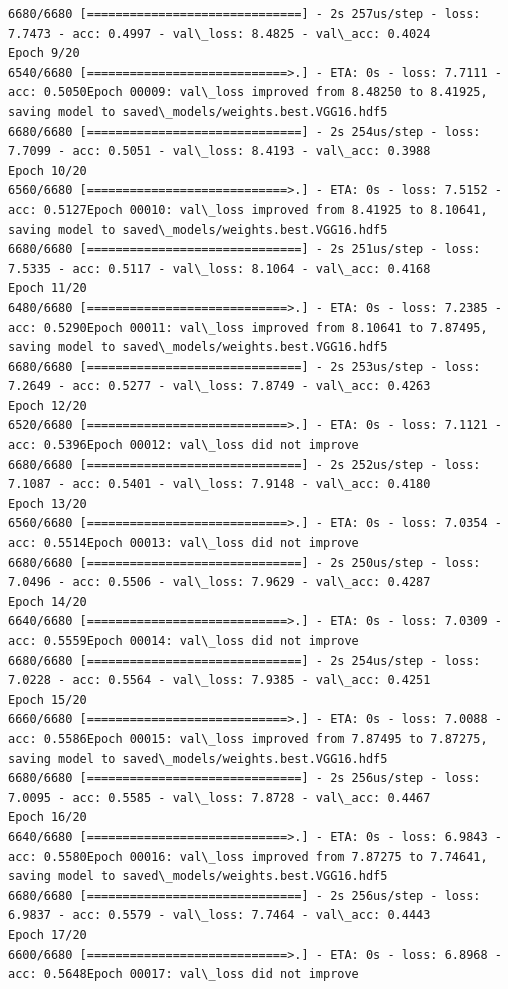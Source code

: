 \documentclass[11pt]{article}
\begin{document}
\begin{Verbatim}[commandchars=\\\{\}]
6680/6680 [==============================] - 2s 257us/step - loss: 7.7473 - acc: 0.4997 - val\_loss: 8.4825 - val\_acc: 0.4024
Epoch 9/20
6540/6680 [============================>.] - ETA: 0s - loss: 7.7111 - acc: 0.5050Epoch 00009: val\_loss improved from 8.48250 to 8.41925, saving model to saved\_models/weights.best.VGG16.hdf5
6680/6680 [==============================] - 2s 254us/step - loss: 7.7099 - acc: 0.5051 - val\_loss: 8.4193 - val\_acc: 0.3988
Epoch 10/20
6560/6680 [============================>.] - ETA: 0s - loss: 7.5152 - acc: 0.5127Epoch 00010: val\_loss improved from 8.41925 to 8.10641, saving model to saved\_models/weights.best.VGG16.hdf5
6680/6680 [==============================] - 2s 251us/step - loss: 7.5335 - acc: 0.5117 - val\_loss: 8.1064 - val\_acc: 0.4168
Epoch 11/20
6480/6680 [============================>.] - ETA: 0s - loss: 7.2385 - acc: 0.5290Epoch 00011: val\_loss improved from 8.10641 to 7.87495, saving model to saved\_models/weights.best.VGG16.hdf5
6680/6680 [==============================] - 2s 253us/step - loss: 7.2649 - acc: 0.5277 - val\_loss: 7.8749 - val\_acc: 0.4263
Epoch 12/20
6520/6680 [============================>.] - ETA: 0s - loss: 7.1121 - acc: 0.5396Epoch 00012: val\_loss did not improve
6680/6680 [==============================] - 2s 252us/step - loss: 7.1087 - acc: 0.5401 - val\_loss: 7.9148 - val\_acc: 0.4180
Epoch 13/20
6560/6680 [============================>.] - ETA: 0s - loss: 7.0354 - acc: 0.5514Epoch 00013: val\_loss did not improve
6680/6680 [==============================] - 2s 250us/step - loss: 7.0496 - acc: 0.5506 - val\_loss: 7.9629 - val\_acc: 0.4287
Epoch 14/20
6640/6680 [============================>.] - ETA: 0s - loss: 7.0309 - acc: 0.5559Epoch 00014: val\_loss did not improve
6680/6680 [==============================] - 2s 254us/step - loss: 7.0228 - acc: 0.5564 - val\_loss: 7.9385 - val\_acc: 0.4251
Epoch 15/20
6660/6680 [============================>.] - ETA: 0s - loss: 7.0088 - acc: 0.5586Epoch 00015: val\_loss improved from 7.87495 to 7.87275, saving model to saved\_models/weights.best.VGG16.hdf5
6680/6680 [==============================] - 2s 256us/step - loss: 7.0095 - acc: 0.5585 - val\_loss: 7.8728 - val\_acc: 0.4467
Epoch 16/20
6640/6680 [============================>.] - ETA: 0s - loss: 6.9843 - acc: 0.5580Epoch 00016: val\_loss improved from 7.87275 to 7.74641, saving model to saved\_models/weights.best.VGG16.hdf5
6680/6680 [==============================] - 2s 256us/step - loss: 6.9837 - acc: 0.5579 - val\_loss: 7.7464 - val\_acc: 0.4443
Epoch 17/20
6600/6680 [============================>.] - ETA: 0s - loss: 6.8968 - acc: 0.5648Epoch 00017: val\_loss did not improve

\end{Verbatim}
\end{document}
